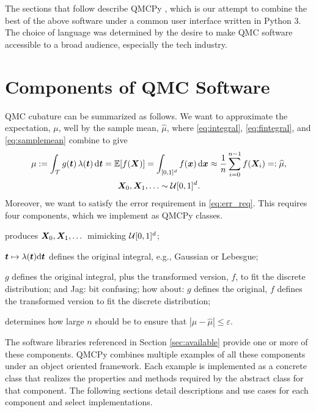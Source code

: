 \documentclass[graybox,footinfo]{svmult}
\newcommand{\QMCPYabs}[1]{\ensuremath{{\left \lvert #1 \right \rvert}}}
\newcommand{\JRComment}[1]{{\color{yellow} Jag: #1}}
\newcommand{\hmu}{\widehat{\mu}}
\newcommand{\cube}{[0,1]^d}
\begin{document}
The sections that follow describe QMCPy \cite{QMCPy2020a}, which is our attempt to combine the best of the above software under a common user interface written in Python 3.  The choice of language was determined by the desire to make QMC software accessible to a broad audience, especially the tech industry.

\section{Components of QMC Software}
QMC cubature can be summarized as follows.  We want to approximate the expectation, $\mu$, well by the sample mean, $\hmu$, where \eqref{eq:integral}, \eqref{eq:fintegral}, and \eqref{eq:samplemean} combine to give
\begin{multline} \label{eq:cubSummary}
	\mu : = \int_\calT g(\bst) \, \lambda(\bst) \, \D \bst  = \bbE[f(\bsX)] = \int_{\cube} f(\bsx) \, \D \bsx \approx \frac 1n \sum_{i=0}^{n-1} f(\bsX_i) =: \hmu, \\
	 \bsX_0, \bsX_1, \ldots \sim \calU\cube.
\end{multline}
Moreover, we want to satisfy the error requirement in \eqref{eq:err_req}.
This requires four components, which we implement as QMCPy classes.

\begin{description}[format=\textup,format=\textbf]
	
	\item[Discrete Distribution]  produces ${\boldsymbol{X}}_0, {\boldsymbol{X}}_1, \dots$ mimicking ${\mathcal{U}}[0,1]^d$;
	
	\item[True Measure] ${\boldsymbol{t}} \mapsto \lambda ({\boldsymbol{t}}) \mathrm{d} {\boldsymbol{t}}$  defines the original integral, e.g., Gaussian or Lebesgue;
	
	\item[Integrand] $g$  defines the original integral, plus the transformed version, $f$, to fit the discrete distribution; and
	\JRComment{bit confusing; how about: $g$  defines the original, $f$ defines the transformed version to fit the discrete distribution;}
	
	\item[Stopping Criterion] determines how large $n$ should be to ensure that $\QMCPYabs{\mu - \hmu} \le \varepsilon$.
\end{description}

The software libraries referenced in Section \ref{sec:available} provide one or more of these components. QMCPy combines multiple examples of all these components under an object oriented framework. Each example is implemented as a concrete class that realizes the properties and methods required by the abstract class for that component. The following sections detail descriptions and use cases for each component and select implementations. 
\end{document}
